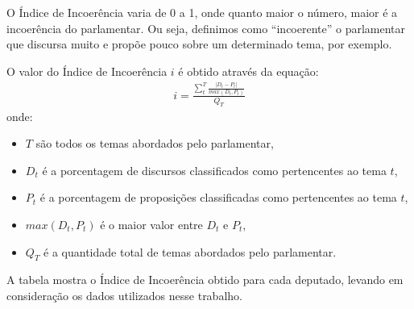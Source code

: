 \begin{apendicesenv}
O Índice de Incoerência varia de 0 a 1, onde quanto maior o número, maior é a incoerência do parlamentar. Ou seja, definimos como ``incoerente'' o parlamentar que discursa muito e propõe pouco sobre um determinado tema, por exemplo.

O valor do Índice de Incoerência \(i\) é obtido através da equação:
\begin{align}
  i = \frac{\displaystyle\sum_{t}^{T} \frac{|D_{t} - P_{t}|}{max(D_{t} , P_{t})}}{Q_{T}}
\end{align}
onde:

\begin{itemize}
  \item \(T\) são todos os temas abordados pelo parlamentar,
  \item \(D_{t}\) é a porcentagem de discursos classificados como pertencentes ao tema \(t\),
  \item \(P_{t}\) é a porcentagem de proposições classificadas como pertencentes ao tema \(t\),
  \item \(max(D_{t} , P_{t})\) é o maior valor entre \(D_{t}\) e \(P_{t}\),
  \item \(Q_{T}\) é a quantidade total de temas abordados pelo parlamentar.
\end{itemize}

A tabela mostra o Índice de Incoerência obtido para cada deputado, levando em consideração os dados utilizados nesse trabalho.


\end{apendicesenv}
